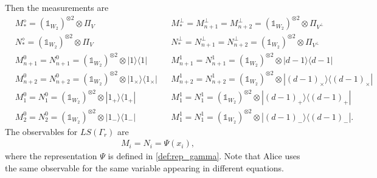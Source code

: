 \documentclass[11pt,letterpaper]{article}
\newcommand{\ketbra}[2]{|#1\rangle\langle#2|}
\newcommand{\x}{\otimes}
\newcommand{\1}{\mathbb{1}}
\newcommand{\LS}{LS}
\theoremstyle{definition}
\begin{document}
Then the measurements are
\begin{align*}
	&M_\ast^\diamond =(\1_{W_2})^{\x 2} \x \Pi_V && M_\ast^\perp = M_{n+1}^\perp = M_{n+2}^\perp = (\1_{W_2})^{\x 2} \x \Pi_{V^\perp}\\
	&N_\ast^\diamond = (\1_{W_2})^{\x 2} \x \Pi_V && N_\ast^\perp = N_{n+1}^\perp = N_{n+2}^\perp = (\1_{W_2})^{\x 2} \x \Pi_{V^\perp}\\
	&M_{n+1}^0 =N_{n+1}^0=(\1_{W_2})^{\x 2} \x  \ketbra{1}{1} && M_{n+1}^1=N_{n+1}^1 = (\1_{W_2})^{\x 2} \x \ketbra{d-1}{d-1}\\
	&M_{n+2}^0 =N_{n+2}^0=(\1_{W_2})^{\x 2} \x  \ketbra{1_{\times}}{1_{\times}} && M_{n+2}^1= N_{n+2}^1 = (\1_{W_2})^{\x 2} \x \ketbra{(d-1)_{\times}}{(d-1)_{\times}}\\
	&M_1^0 = N_1^0 =(\1_{W_2})^{\x 2} \x  \ketbra{1_+}{1_+} && M_1^1 = N_1^1 =(\1_{W_2})^{\x 2} \x  \ketbra{(d-1)_+}{(d-1)_+}\\
	&M_2^0 = N_2^0 = (\1_{W_2})^{\x 2} \x \ketbra{1_-}{1_-} && M_1^1 = N_1^1 = (\1_{W_2})^{\x 2} \x \ketbra{(d-1)_-}{(d-1)_-}.
\end{align*}
The observables for $\LS(\Gamma_r)$ are
\begin{align}
	M_i = N_i = \Psi(x_i),
\end{align}
where the representation $\Psi$ is defined in \cref{def:rep_gamma}.
Note that Alice uses the same observable for the same variable appearing in different equations.
\end{document}
